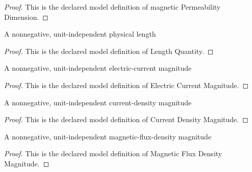 \begin{proof}
  This is the declared model definition of magnetic Permeability Dimension.
\end{proof}
\begin{definition}
  \label{def:physics:phyx-mini-0975:phyxminiproblems-problemphyxmini0975-lengthquantity}
  A nonnegative, unit-independent physical length
\end{definition}
\begin{proof}
  This is the declared model definition of Length Quantity.
\end{proof}
\begin{definition}
  \label{def:physics:phyx-mini-0975:phyxminiproblems-problemphyxmini0975-electriccurrentmagnitude}
  A nonnegative, unit-independent electric-current magnitude
\end{definition}
\begin{proof}
  This is the declared model definition of Electric Current Magnitude.
\end{proof}
\begin{definition}
  \label{def:physics:phyx-mini-0975:phyxminiproblems-problemphyxmini0975-currentdensitymagnitude}
  A nonnegative, unit-independent current-density magnitude
\end{definition}
\begin{proof}
  This is the declared model definition of Current Density Magnitude.
\end{proof}
\begin{definition}
  \label{def:physics:phyx-mini-0975:phyxminiproblems-problemphyxmini0975-magneticfluxdensitymagnitude}
  A nonnegative, unit-independent magnetic-flux-density magnitude
\end{definition}
\begin{proof}
  This is the declared model definition of Magnetic Flux Density Magnitude.
\end{proof}
